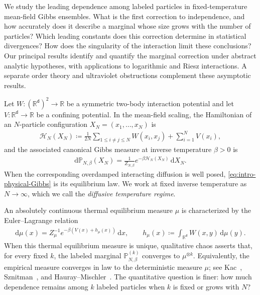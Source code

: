 \documentclass[11pt,reqno]{amsart}
\numberwithin{equation}{section}
\theoremstyle{plain}
\theoremstyle{remark}
\renewcommand{\d}{\mathsf{d}}
\newcommand{\md}{\mathrm{d}}
\newcommand{\R}{{\mathbb{R}}}
\newcommand{\Pb}{{\mathbb{P}}}
\newcommand{\XN}{X_N}
\newcommand{\be}{\beta}
\begin{document}
We study the leading dependence among labeled particles in fixed-temperature mean-field Gibbs ensembles.  What is the first correction to independence, and how accurately does it describe a marginal whose size grows with the number of particles?  Which leading constants does this correction determine in statistical divergences?  How does the singularity of the interaction limit these conclusions?  Our principal results identify and quantify the marginal correction under abstract analytic hypotheses, with applications to logarithmic and Riesz interactions.  A separate order theory and ultraviolet obstructions complement these asymptotic results.

Let \(W:(\R^\d)^2\to\R\) be a symmetric two-body interaction potential and let \(V:\R^\d\to\R\) be a confining potential.  In the mean-field scaling, the Hamiltonian of an \(N\)-particle configuration \(\XN=(x_1,\ldots,x_N)\) is
\begin{align}\label{eq:intro-physical-Hamiltonian}
 \mathcal H_N(\XN)
 \coloneqq
 \frac{1}{2N}\sum_{1\le i\ne j\le N}W(x_i,x_j)
 +\sum_{i=1}^N V(x_i),
\end{align}
and the associated canonical Gibbs measure at inverse temperature \(\be>0\) is
\begin{align}\label{eq:intro-physical-Gibbs}
 \md\Pb_{N,\be}(\XN)
 =\frac{1}{Z_{N,\be}}e^{-\be\mathcal H_N(\XN)}\,\md\XN.
\end{align}
When the corresponding overdamped interacting diffusion is well posed, \eqref{eq:intro-physical-Gibbs} is its equilibrium law.  We work at fixed inverse temperature as \(N\to\infty\), which we call the \emph{diffusive temperature regime}.

An absolutely continuous thermal equilibrium measure \(\mu\) is characterized by the Euler--Lagrange relation
\begin{align}\label{eq:intro-mean-field-equilibrium}
 \md\mu(x)=Z_\mu^{-1}e^{-\be(V(x)+h_\mu(x))}\,\md x,
 \qquad
 h_\mu(x)\coloneqq\int_{\R^\d}W(x,y)\,\md\mu(y).
\end{align}
When this thermal equilibrium measure is unique, qualitative chaos asserts that, for every fixed \(k\), the labeled marginal \(\Pb_{N,\be}^{(k)}\) converges to \(\mu^{\otimes k}\).  Equivalently, the empirical measure converges in law to the deterministic measure \(\mu\); see Kac~\cite{Kac1956}, Sznitman~\cite{Sznitman1991}, and Hauray--Mischler~\cite{HaurayMischler2014}.  The quantitative question is finer: how much dependence remains among \(k\) labeled particles when \(k\) is fixed or grows with \(N\)?
\end{document}
